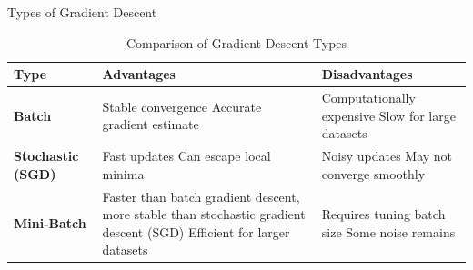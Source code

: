\documentclass[serif, aspectratio=169]{beamer}
\begin{document}
\begin{frame}{Types of Gradient Descent}
\begin{table}[h!]
\centering
\begin{tabularx}{\textwidth}{@{} lX X @{}}
\toprule
\textbf{Type} & \textbf{Advantages} & \textbf{Disadvantages} \\ 
\midrule
\textbf{Batch}   & 
Stable convergence \newline 
Accurate gradient estimate  & 
Computationally expensive \newline 
Slow for large datasets \\ 
\midrule
\textbf{Stochastic (SGD)}   & 
Fast updates \newline 
Can escape local minima & 
Noisy updates \newline 
May not converge smoothly \\ 
\midrule
\textbf{Mini-Batch}   & 
Faster than batch gradient descent, more stable than stochastic gradient descent (SGD) \newline 
Efficient for larger datasets & 
Requires tuning batch size \newline 
Some noise remains \\ 
\bottomrule
\end{tabularx}
\caption{\footnotesize Comparison of Gradient Descent Types}
\end{table}
\end{frame}
\end{document}
